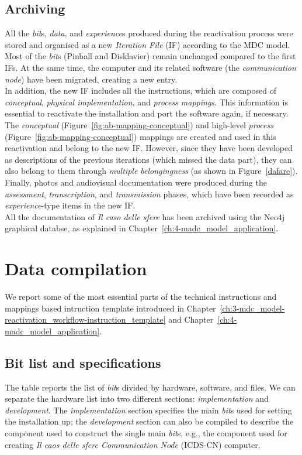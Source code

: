 \subsection*{Archiving}
All the \textit{bit}s, \textit{data}, and \textit{experience}s produced during the reactivation process were stored and organised as a new \textit{Iteration File} (IF) according to the MDC model.\\ 
Most of the \textit{bit}s (Pinball and Disklavier) remain unchanged compared to the first IFs. At the same time, the computer and its related software (the \textit{communication node}) have been migrated, creating a new entry.\\ 
In addition, the new IF includes all the instructions, which are composed of \textit{conceptual}, \textit{physical implementation}, and \textit{process mappings}. This information is essential to reactivate the installation and port the software again, if necessary. The \textit{conceptual} (Figure~\ref{fig:ab-mapping-conceptual}) and high-level \textit{process} (Figure~\ref{fig:ab-mapping-conceptual}) mappings are created and used in this reactivation and belong to the new IF. However, since they have been developed as descriptions of the previous iterations (which missed the data part), they can also belong to them through \textit{multiple belongingness} (as shown in Figure~\ref{dafare}). \\
Finally, photos and audiovisual documentation were produced during the \textit{assessment}, \textit{transcription}, and \textit{transmission} phases, which have been recorded as \textit{experience}-type items in the new IF.\\
All the documentation of \textit{Il caso delle sfere} has been archived using the Neo4j graphical databse, as explained in Chapter~\ref{ch:4-madc_model_application}.

\section{Data compilation}
We report some of the most essential parts of the technical instructions and mappings based intruction template introduced in Chapter~\ref{ch:3-mdc_model-reactivation_workflow-instruction_template} and Chapter~\ref{ch:4-madc_model_application}.

\subsection*{Bit list and specifications}
The table reports the list of \textit{bit}s divided by hardware, software, and files. We can separate the hardware list into two different sections: \textit{implementation} and \textit{development}. The \textit{implementation} section specifies the main \textit{bit}s used for setting the installation up; the \textit{development} section can also be compiled to describe the component used to construct the single main \textit{bit}s, e.g., the component used for creating \textit{Il caos delle sfere Communication Node }(ICDS-CN) computer.

